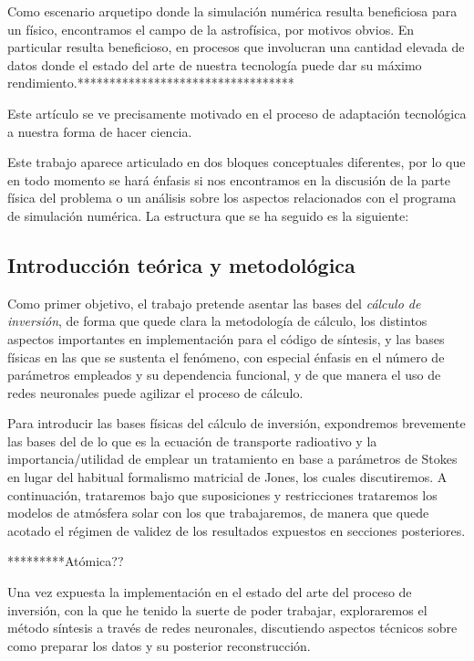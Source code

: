 \documentclass[8pt]{article}
\begin{document}
	Como escenario arquetipo donde la simulación numérica resulta beneficiosa para un físico, encontramos el campo de la astrofísica, por motivos obvios. En particular resulta beneficioso, en procesos que involucran una cantidad elevada de datos donde el estado del arte de nuestra tecnología puede dar su máximo rendimiento.********************************** \newline
	
	Este artículo se ve precisamente motivado en el proceso de adaptación tecnológica a nuestra forma de hacer ciencia.\newline
		
	Este trabajo aparece articulado en dos bloques conceptuales diferentes, por lo que en todo momento se hará énfasis si nos encontramos en la discusión de la parte física del problema o un análisis sobre los aspectos relacionados con el programa de simulación numérica. La estructura que se ha seguido es la siguiente:\newline
	
	
	\subsection{Introducción teórica y metodológica}
	
	Como primer objetivo, el trabajo pretende asentar las bases del \emph{cálculo de inversión}, de forma que quede clara la metodología de cálculo, los distintos aspectos importantes en implementación para el código de síntesis, y las bases físicas en las que se sustenta el fenómeno, con especial énfasis en el número de parámetros empleados y su dependencia funcional, y de que manera el uso de redes neuronales puede agilizar el proceso de cálculo.\newline
	
	 Para introducir las bases físicas del cálculo de inversión, expondremos brevemente las bases del de lo que es la ecuación de transporte radioativo y la importancia/utilidad de emplear un tratamiento en base a parámetros de Stokes en lugar del habitual formalismo matricial de Jones, los cuales discutiremos. A continuación, trataremos bajo que suposiciones y restricciones trataremos los modelos de atmósfera solar con los que trabajaremos, de manera que quede acotado el régimen de validez de los resultados expuestos en secciones posteriores.\newline
	 
	 *********Atómica??
	
	Una vez expuesta la implementación en el estado del arte del proceso de inversión, con la que he tenido la suerte de poder trabajar, exploraremos el método síntesis a través de redes neuronales, discutiendo aspectos técnicos sobre como preparar los datos y su posterior reconstrucción.\newline
	
\end{document}
